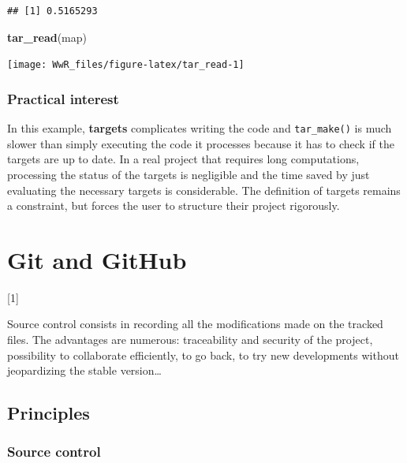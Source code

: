 \documentclass[
  12pt,
  american,
  a4paper,
  extrafontsizes,onecolumn,openright
  ]{memoir}
\newenvironment{Shaded}{\begin{snugshade}}{\end{snugshade}}
\newcommand{\FunctionTok}[1]{\textcolor[rgb]{0.13,0.29,0.53}{\textbf{#1}}}
\newcommand{\NormalTok}[1]{#1}
\newcommand{\toc}[1]{%
  \startcontents[chapters]%
  \printcontents[chapters]{}{1}[#1]{}%
  ~\newline%
}
\begin{document}
\begin{verbatim}
## [1] 0.5165293
\end{verbatim}

\begin{Shaded}
\begin{Highlighting}[]
\FunctionTok{tar\_read}\NormalTok{(map)}
\end{Highlighting}
\end{Shaded}

\begin{center}\texttt{[image: WwR\_files/figure-latex/tar\_read-1]} \end{center}

\normalsize

\subsection{Practical interest}\label{practical-interest}

In this example, \textbf{targets} complicates writing the code and \texttt{tar\_make()} is much slower than simply executing the code it processes because it has to check if the targets are up to date.
In a real project that requires long computations, processing the status of the targets is negligible and the time saved by just evaluating the necessary targets is considerable.
The definition of targets remains a constraint, but forces the user to structure their project rigorously.

\chapter{Git and GitHub}\label{chap-git}

\toc{1}

Source control consists in recording all the modifications made on the tracked files.
The advantages are numerous: traceability and security of the project, possibility to collaborate efficiently, to go back, to try new developments without jeopardizing the stable version\ldots{}

\section{Principles}\label{sec:principes-git}

\subsection{Source control}\label{sec:git-cds}
\end{document}

